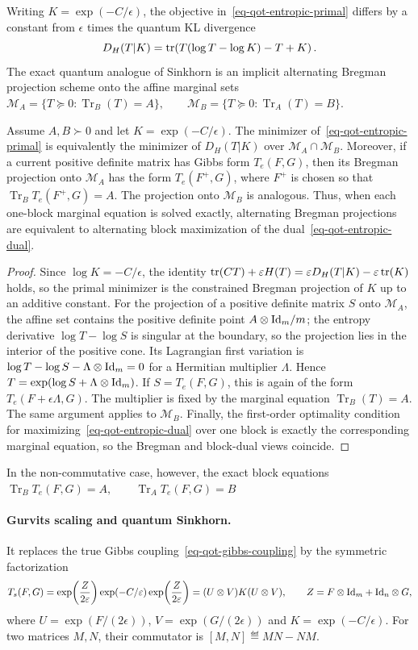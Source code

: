 Writing $K=\exp(-C/\epsilon)$, the objective in~\eqref{eq-qot-entropic-primal} differs by a constant from $\epsilon$ times the quantum KL divergence
\[
D_H(T|K)
=
\operatorname{tr}\!\left(T(\log T-\log K)-T+K\right).
\]
The exact quantum analogue of Sinkhorn is an implicit alternating Bregman projection scheme onto the affine marginal sets
\(\mathcal M_A=\{T\succeq0:\operatorname{Tr}_B(T)=A\}, \qquad \mathcal M_B=\{T\succeq0:\operatorname{Tr}_A(T)=B\}.\)
\begin{prop}\label{prop-qot-bregman-projections}
Assume $A,B\succ0$ and let $K=\exp(-C/\epsilon)$. The minimizer of~\eqref{eq-qot-entropic-primal} is equivalently the minimizer of $D_H(T|K)$ over $\mathcal M_A\cap\mathcal M_B$. Moreover, if a current positive definite matrix has Gibbs form $T_e(F,G)$, then its Bregman projection onto $\mathcal M_A$ has the form $T_e(F^+,G)$, where $F^+$ is chosen so that $\operatorname{Tr}_B T_e(F^+,G)=A$. The projection onto $\mathcal M_B$ is analogous. Thus, when each one-block marginal equation is solved exactly, alternating Bregman projections are equivalent to alternating block maximization of the dual~\eqref{eq-qot-entropic-dual}.
\end{prop}
\begin{proof}
Since $\log K=-C/\epsilon$, the identity
\(\operatorname{tr}(CT)+\varepsilon H(T) = \varepsilon D_H(T|K)-\varepsilon\operatorname{tr}(K)\)
holds, so the primal minimizer is the constrained Bregman projection of $K$ up to an additive constant. For the projection of a positive definite matrix $S$ onto $\mathcal M_A$, the affine set contains the positive definite point $A\otimes\mathrm{Id}_m/m$; the entropy derivative $\log T-\log S$ is singular at the boundary, so the projection lies in the interior of the positive cone. Its Lagrangian first variation is
\(\log T-\log S-\Lambda\otimes\mathrm{Id}_m=0\)
for a Hermitian multiplier $\Lambda$. Hence $T=\exp(\log S+\Lambda\otimes\mathrm{Id}_m)$. If $S=T_e(F,G)$, this is again of the form $T_e(F+\epsilon\Lambda,G)$. The multiplier is fixed by the marginal equation $\operatorname{Tr}_B(T)=A$. The same argument applies to $\mathcal M_B$. Finally, the first-order optimality condition for maximizing~\eqref{eq-qot-entropic-dual} over one block is exactly the corresponding marginal equation, so the Bregman and block-dual views coincide.
\end{proof}
In the non-commutative case, however, the exact block equations
\(\operatorname{Tr}_B T_e(F,G)=A, \qquad \operatorname{Tr}_A T_e(F,G)=B\)
\paragraph{Gurvits scaling and quantum Sinkhorn.}
It replaces the true Gibbs coupling~\eqref{eq-qot-gibbs-coupling} by the symmetric factorization
\begin{equation}\label{eq-qot-symmetric-scaling}
T_s(F,G)
=
\exp\!\left(\frac{Z}{2\varepsilon}\right)\exp(-C/\varepsilon)\exp\!\left(\frac{Z}{2\varepsilon}\right)
=
(U\otimes V)K(U\otimes V),
\qquad
Z=F\otimes\mathrm{Id}_m+\mathrm{Id}_n\otimes G,
\end{equation}
where $U=\exp(F/(2\epsilon))$, $V=\exp(G/(2\epsilon))$ and $K=\exp(-C/\epsilon)$. For two matrices $M,N$, their commutator is $[M,N]\eqdef MN-NM$.

